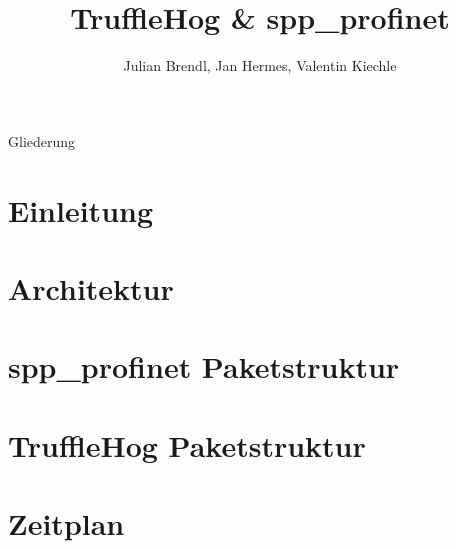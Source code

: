 \documentclass[18pt]{beamer}
\title[TruffleHog \& spp\_profinet]{TruffleHog \& spp\_profinet}
\author{Julian Brendl, Jan Hermes, Valentin Kiechle}
\institute{Fraunhofer IOSB}
\begin{document}

\begin{frame}
	\titlepage
\end{frame}

\begin{frame}{Gliederung}
	\tableofcontents
\end{frame}

\section{Einleitung}


\section{Architektur}





















\section{spp_profinet Paketstruktur}

\section{TruffleHog Paketstruktur}
	
	\subsection{}
	

	\section{Zeitplan}

\appendix
\beginbackup
\backupend
\end{document}
